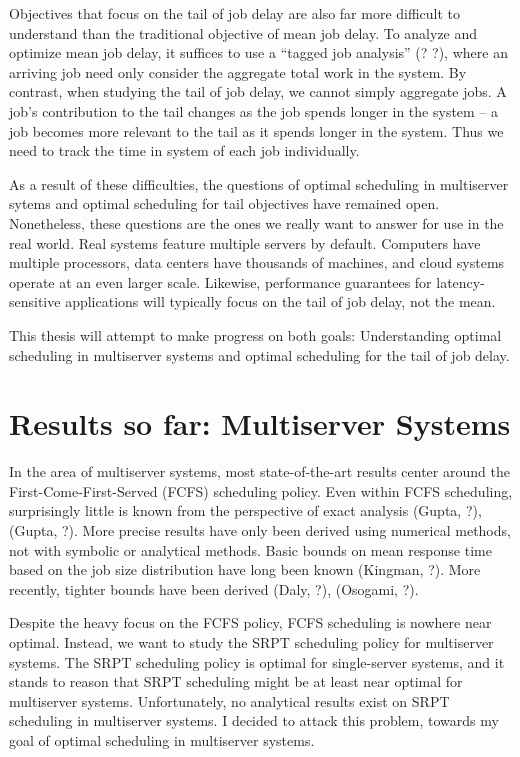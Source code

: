 \documentclass[12pt]{article}
\begin{document}
Objectives that focus on the tail of job delay are also far more difficult to understand
than the traditional objective of mean job delay.
To analyze and optimize mean job delay, it suffices to use a ``tagged job analysis'' (? ?),
where an arriving job need only consider the aggregate total work in the system.
By contrast, when studying the tail of job delay, we cannot simply aggregate jobs.
A job's contribution to the tail changes as the job spends longer in the system --
a job becomes more relevant to the tail as it spends longer in the system.
Thus we need to track the time in system of each job individually.

As a result of these difficulties,
the questions of optimal scheduling in multiserver sytems
and optimal scheduling for tail objectives have remained open.
Nonetheless, these questions are the ones we really want to answer for use in the real world.
Real systems feature multiple servers by default.
Computers have multiple processors,
data centers have thousands of machines,
and cloud systems operate at an even larger scale.
Likewise, performance guarantees for latency-sensitive applications
will typically focus on the tail of job delay, not the mean.

This thesis will attempt to make progress on both goals:
Understanding optimal scheduling in multiserver systems
and optimal scheduling for the tail of job delay.

\section{Results so far: Multiserver Systems}

In the area of multiserver systems,
most state-of-the-art results center around the First-Come-First-Served (FCFS) scheduling policy.
Even within FCFS scheduling, surprisingly little is known from the perspective of exact analysis
(Gupta, ?), (Gupta, ?).
More precise results have only been derived using numerical methods,
not with symbolic or analytical methods.
Basic bounds on mean response time based on the job size distribution
have long been known (Kingman, ?).
More recently, tighter bounds have been derived (Daly, ?), (Osogami, ?).

Despite the heavy focus on the FCFS policy, FCFS scheduling is nowhere near optimal.
Instead, we want to study the SRPT scheduling policy for multiserver systems.
The SRPT scheduling policy is optimal for single-server systems,
and it stands to reason that SRPT scheduling might be at least near optimal
for multiserver systems.
Unfortunately, no analytical results exist on SRPT scheduling in multiserver systems.
I decided to attack this problem, towards my goal of optimal scheduling in multiserver systems.
\end{document}
